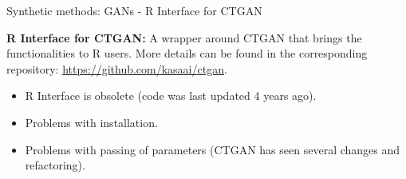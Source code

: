 \documentclass[
	aspectratio = 169
 ]{beamer}
\begin{document}
\begin{frame}{Synthetic methods: GANs - R Interface for CTGAN}

    \textbf{R Interface for CTGAN:} A wrapper around CTGAN that brings the functionalities to R users. More details can be found in the corresponding repository: \href{https://github.com/kasaai/ctgan}{\color{blue}\underline{https://github.com/kasaai/ctgan}}.
    \begin{itemize}
    \item R Interface is obsolete (code was last updated 4 years ago).
    \item Problems with installation.
    \item Problems with passing of parameters (CTGAN has seen several changes and refactoring).
    \end{itemize}

\end{frame}
\end{document}
